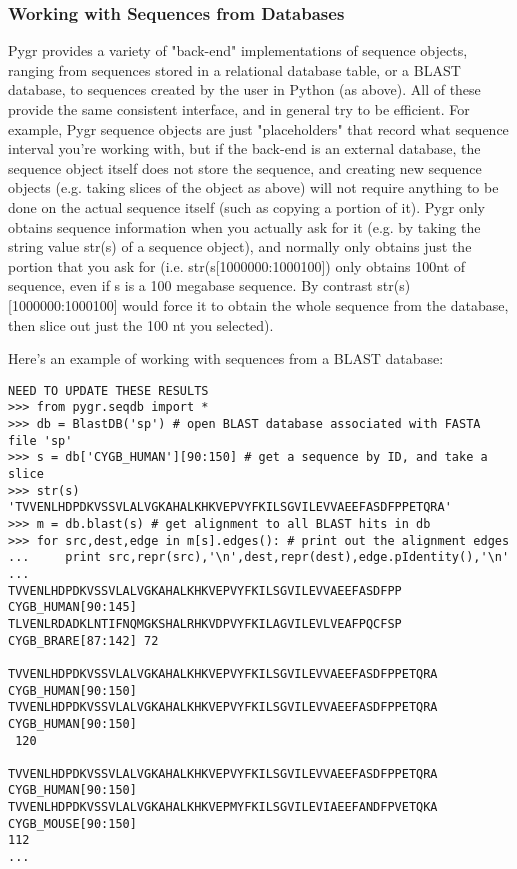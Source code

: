\documentclass{howto}
\begin{document}
\subsubsection{Working with Sequences from Databases}

Pygr provides a variety of "back-end" implementations of sequence objects, ranging from sequences stored in a relational database table, or a BLAST database, to sequences created by the user in Python (as above).  All of these provide the same consistent interface, and in general try to be efficient.  For example, Pygr sequence objects are just "placeholders" that record what sequence interval you're working with, but if the back-end is an external database, the sequence object itself does not store the sequence, and creating new sequence objects (e.g. taking slices of the object as above) will not require anything to be done on the actual sequence itself (such as copying a portion of it).  Pygr only obtains sequence information when you actually ask for it (e.g. by taking the string value str(s) of a sequence object), and normally only obtains just the portion that you ask for (i.e. str(s[1000000:1000100]) only obtains 100nt of sequence, even if s is a 100 megabase sequence.  By contrast str(s)[1000000:1000100] would force it to obtain the whole sequence from the database, then slice out just the 100 nt you selected). 

Here's an example of working with sequences from a BLAST database:

\begin{verbatim}
NEED TO UPDATE THESE RESULTS
>>> from pygr.seqdb import *
>>> db = BlastDB('sp') # open BLAST database associated with FASTA file 'sp'
>>> s = db['CYGB_HUMAN'][90:150] # get a sequence by ID, and take a slice
>>> str(s)
'TVVENLHDPDKVSSVLALVGKAHALKHKVEPVYFKILSGVILEVVAEEFASDFPPETQRA'
>>> m = db.blast(s) # get alignment to all BLAST hits in db
>>> for src,dest,edge in m[s].edges(): # print out the alignment edges
...     print src,repr(src),'\n',dest,repr(dest),edge.pIdentity(),'\n'
... 
TVVENLHDPDKVSSVLALVGKAHALKHKVEPVYFKILSGVILEVVAEEFASDFPP CYGB_HUMAN[90:145] 
TLVENLRDADKLNTIFNQMGKSHALRHKVDPVYFKILAGVILEVLVEAFPQCFSP CYGB_BRARE[87:142] 72

TVVENLHDPDKVSSVLALVGKAHALKHKVEPVYFKILSGVILEVVAEEFASDFPPETQRA CYGB_HUMAN[90:150] 
TVVENLHDPDKVSSVLALVGKAHALKHKVEPVYFKILSGVILEVVAEEFASDFPPETQRA CYGB_HUMAN[90:150]
 120

TVVENLHDPDKVSSVLALVGKAHALKHKVEPVYFKILSGVILEVVAEEFASDFPPETQRA CYGB_HUMAN[90:150] 
TVVENLHDPDKVSSVLALVGKAHALKHKVEPMYFKILSGVILEVIAEEFANDFPVETQKA CYGB_MOUSE[90:150]
112 
...
\end{verbatim}
\end{document}
